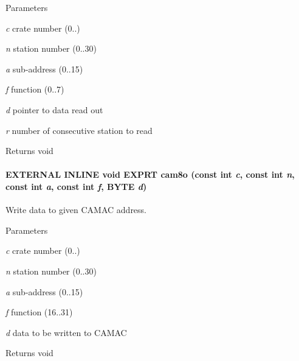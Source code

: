 \begin{DoxyParams}{Parameters}
\item[{\em c}]crate number (0..) \item[{\em n}]station number (0..30) \item[{\em a}]sub-\/address (0..15) \item[{\em f}]function (0..7) \item[{\em d}]pointer to data read out \item[{\em r}]number of consecutive station to read \end{DoxyParams}
\begin{DoxyReturn}{Returns}
void 
\end{DoxyReturn}
\paragraph[{cam8o}]{\setlength{\rightskip}{0pt plus 5cm}EXTERNAL INLINE void EXPRT cam8o (const int {\em c}, \/  const int {\em n}, \/  const int {\em a}, \/  const int {\em f}, \/  {\bf BYTE} {\em d})}\hfill\label{group__mcstdfunctionh_gaf4fc105dccac5ca09337af789f554831}
Write data to given CAMAC address. 
\begin{DoxyParams}{Parameters}
\item[{\em c}]crate number (0..) \item[{\em n}]station number (0..30) \item[{\em a}]sub-\/address (0..15) \item[{\em f}]function (16..31) \item[{\em d}]data to be written to CAMAC \end{DoxyParams}
\begin{DoxyReturn}{Returns}
void 
\end{DoxyReturn}
